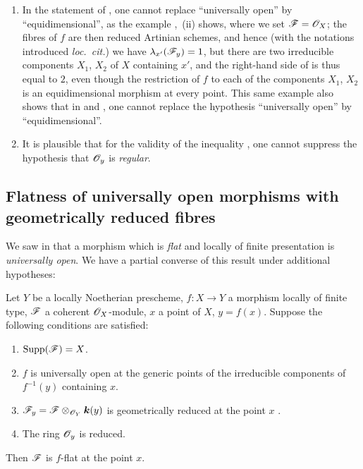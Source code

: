 \begin{remarks}[15.1.4]
\label{IV.15.1.4}
\begin{enumerate}[label=(\roman*)]
  \item In the statement of , one cannot replace ``universally open'' by ``equidimensional'', as the example ,~(ii) shows, where we set $\mathscr{F}=\mathscr{O}_X$; the fibres of $f$ are then reduced Artinian schemes, and hence (with the notations introduced \emph{loc.\ cit.}) we have $\lambda_{x'}(\mathscr{F}_y)=1$, but there are two irreducible components $X_1$, $X_2$ of $X$ containing $x'$, and the right-hand side of  is thus equal to $2$, even though the restriction of $f$ to each of the components $X_1$, $X_2$ is an equidimensional morphism at every point.
This same example also shows that in  and , one cannot replace the hypothesis ``universally open'' by ``equidimensional''.
  \item It is plausible that for the validity of the inequality , one cannot suppress the hypothesis that $\mathscr{O}_y$ is \emph{regular}.
\end{enumerate}
\end{remarks}

\subsection{Flatness of universally open morphisms with geometrically reduced fibres}
\label{subsection:IV.15.2}

\begin{env}[15.2.1]
\label{IV.15.2.1}
We saw in  that a morphism which is \emph{flat} and locally of finite presentation is \emph{universally open}.
We have a partial converse of this result under additional hypotheses:
\end{env}

\begin{theorem}[15.2.2]
\label{IV.15.2.2}
Let $Y$ be a locally Noetherian prescheme, $f:X\to Y$ a morphism locally of finite type, $\mathscr{F}$ a coherent $\mathscr{O}_X$-module, $x$ a point of $X$, $y=f(x)$.
Suppose the following conditions are satisfied:
\begin{enumerate}[label=\textup{(\roman*)}]
  \item $\operatorname{Supp}(\mathscr{F})=X$.
  \item $f$ is universally open at the generic points of the irreducible components of $f^{-1}(y)$ containing $x$.
  \item $\mathscr{F}_y=\mathscr{F}\otimes_{\mathscr{O}_Y}\boldsymbol{k}(y)$ is geometrically reduced at the point $x$ .
  \item The ring $\mathscr{O}_y$ is reduced.
\end{enumerate}
Then $\mathscr{F}$ is $f$-flat at the point $x$.
\end{theorem}

